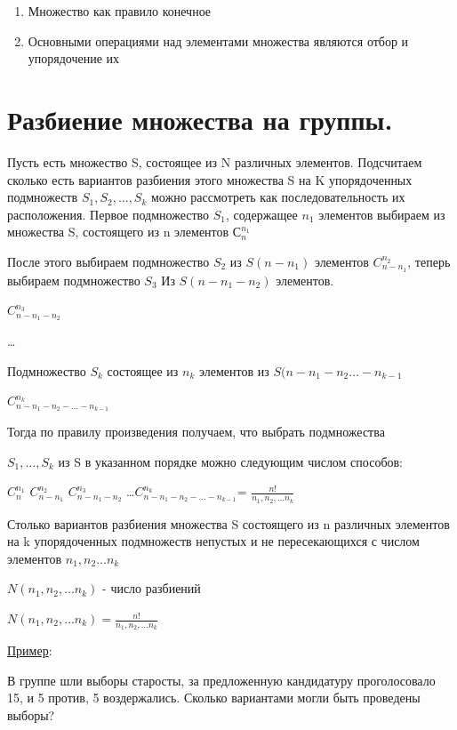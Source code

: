 \documentclass[12pt, a4paper, oneside]{article}
\theoremstyle{plain} %
\theoremstyle{definition}
\begin{document}
\begin{enumerate}
    \item Множество как правило конечное 
    \item Основными операциями над элементами множества являются отбор и упорядочение их
    
\end{enumerate}

\section{Разбиение множества на группы.}

Пусть есть множество S, состоящее из N различных элементов. Подсчитаем сколько есть вариантов разбиения этого множества S на K упорядоченных подмножеств $S_1,S_2, \dots ,S_k$  можно рассмотреть как последовательность их расположения. Первое подмножество $S_1$, содержащее $n_1$ элементов выбираем из множества S, состоящего из n элементов $С_ {n}^{n_1}$ 

После этого выбираем подмножество $S_2$ из $S(n-{n_1})$ элементов $C_{n-{n_1}}^{n_2} $, теперь выбираем подмножество $S_3$ Из $S(n-{n_1}-{n_2})$ элементов. 

$C_{n-{n_1}-{n_2}}^{n_3} $

\dots

Подмножество $S_k$ состоящее из $n_k$ элементов из $S(n-{n_1}-{n_2}\dots -{n_{k-1}}$  

$C_{n-{n_1}-{n_2}- ...-{n_{k-1}}}^{n_k} $

Тогда по правилу произведения получаем, что выбрать подмножества 

$S_1, \dots , S_k$ из S в указанном порядке можно следующим числом способов:


$C_{n}^{n_1} $
\cdot$C_{n-{n_1}}^{n_2} $
\cdot$C_{n-{n_1}-{n_2}}^{n_3} $
\dots \cdot$C_{n-{n_1}-{n_2}- ...-{n_{k-1}}}^{n_k} $= $\frac{n!}{n_1,n_2,\dots n_k}$

Столько вариантов разбиения множества S состоящего из n различных элементов на k упорядоченных подмножеств непустых и не пересекающихся с числом элементов $n_1,n_2 \dots n_k$

$N(n_1,n_2,\dots n_k)$ - число разбиений

$N(n_1,n_2,\dots n_k) = \frac{n!}{n_1,n_2,\dots n_k}$

\underline{Пример}:

В группе шли выборы старосты, за предложенную кандидатуру проголосовало 15, и 5 против, 5 воздержались. Сколько вариантами могли быть проведены выборы?
\end{document}
